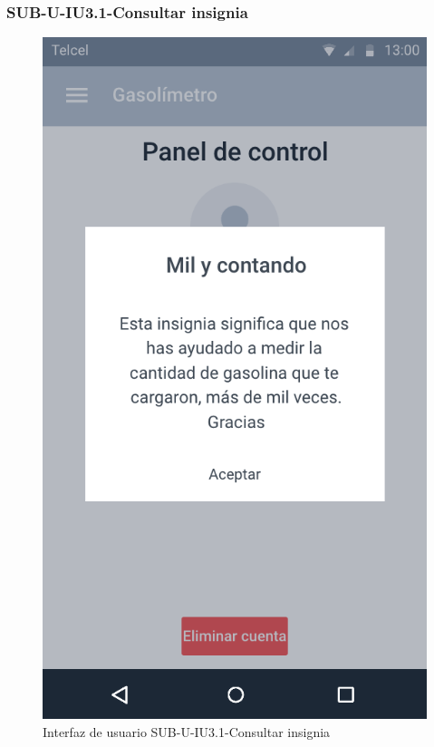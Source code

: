 \subsubsection{SUB-U-IU3.1-Consultar insignia}\label{SUB-C-IU3.1}
\begin{figure}[H]
	\centering
	\includegraphics[scale=.55]{Capitulo4/software/submodulos/usuarios/images/sub-u-iu3_1}
	\caption{Interfaz de usuario SUB-U-IU3.1-Consultar insignia}
	\label{fig:sub-u-iu3.1}
\end{figure}